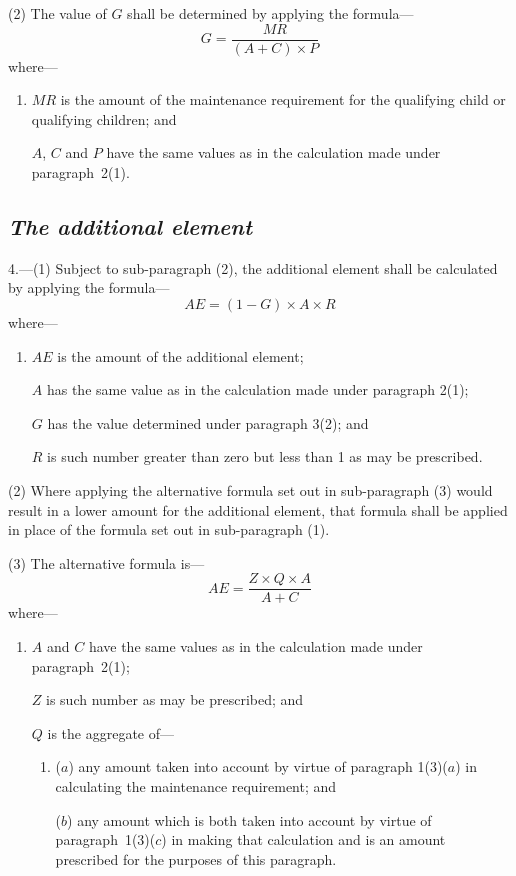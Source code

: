 \documentclass[12pt,a4paper]{article}
\begin{document}
(2) The value of $G$ shall be determined by applying the formula—
\[
G = \frac{MR}{(A + C) \times P}
\]
where—
\begin{enumerate}\item[]
    $MR$ is the amount of the maintenance requirement for the qualifying child or qualifying children; and

    $A$, $C$ and $P$ have the same values as in the calculation made under paragraph~2(1). 
\end{enumerate}


\subsection*{\itshape The additional element}

4.---(1) Subject to sub-paragraph (2), the additional element shall be calculated by applying the formula—
\[
AE = (1 - G) \times A \times R
\]
where—
\begin{enumerate}\item[]
    $AE$ is the amount of the additional element;

    $A$ has the same value as in the calculation made under paragraph 2(1);

    $G$ has the value determined under paragraph 3(2); and

    $R$ is such number greater than zero but less than 1 as may be prescribed. 
\end{enumerate}

(2) Where applying the alternative formula set out in sub-paragraph (3)  would result in a lower amount for the additional element, that formula shall be applied in place of the formula set out in sub-paragraph (1).

(3) The alternative formula is—
\[
AE = \frac{Z \times Q \times A}{A + C}
\]
where—
\begin{enumerate}\item[]
    $A$ and $C$ have the same values as in the calculation made under paragraph~2(1);

    $Z$ is such number as may be prescribed; and

    $Q$ is the aggregate of— 
\begin{enumerate}\item[]
($a$) any amount taken into account by virtue of paragraph 1(3)($a$)  in calculating the maintenance requirement; and

($b$) any amount which is both taken into account by virtue of paragraph~1(3)($c$)  in making that calculation and is an amount prescribed for the purposes of this paragraph.
\end{enumerate}
\end{enumerate}
\end{document}
